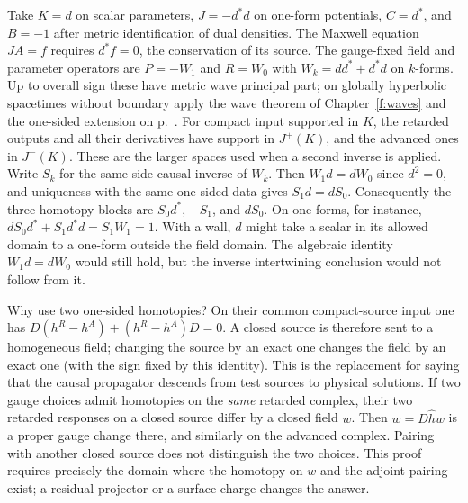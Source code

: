 Take $K=d$ on scalar parameters, $J=-d^*d$ on one-form potentials, $C=d^*$, and $B=-1$ after metric identification of dual densities. The Maxwell equation $JA=f$ requires $d^*f=0$, the conservation of its source. The gauge-fixed field and parameter operators are $P=-W_1$ and $R=W_0$ with $W_k=dd^*+d^*d$ on $k$-forms. Up to overall sign these have metric wave principal part; on globally hyperbolic spacetimes without boundary apply the wave theorem of Chapter~\ref{f:waves} and the one-sided extension on p.~\pageref{f:one-sided-extension}. For compact input supported in $K$, the retarded outputs and all their derivatives have support in $J^+(K)$, and the advanced ones in $J^-(K)$. These are the larger spaces used when a second inverse is applied. Write $S_k$ for the same-side causal inverse of $W_k$. Then $W_1 d=dW_0$ since $d^2=0$, and uniqueness with the same one-sided data gives $S_1d=dS_0$. Consequently the three homotopy blocks are $S_0d^*$, $-S_1$, and $dS_0$. On one-forms, for instance, $dS_0d^*+S_1d^*d=S_1W_1=1$. With a wall, $d$ might take a scalar in its allowed domain to a one-form outside the field domain. The algebraic identity $W_1d=dW_0$ would still hold, but the inverse intertwining conclusion would not follow from it.

Why use two one-sided homotopies? On their common compact-source input one has $D(h^R-h^A)+(h^R-h^A)D=0$. A closed source is therefore sent to a homogeneous field; changing the source by an exact one changes the field by an exact one (with the sign fixed by this identity). This is the replacement for saying that the causal propagator descends from test sources to physical solutions. If two gauge choices admit homotopies on the \emph{same} retarded complex, their two retarded responses on a closed source differ by a closed field $w$. Then $w=D\widehat h w$ is a proper gauge change there, and similarly on the advanced complex. Pairing with another closed source does not distinguish the two choices. This proof requires precisely the domain where the homotopy on $w$ and the adjoint pairing exist; a residual projector or a surface charge changes the answer.

